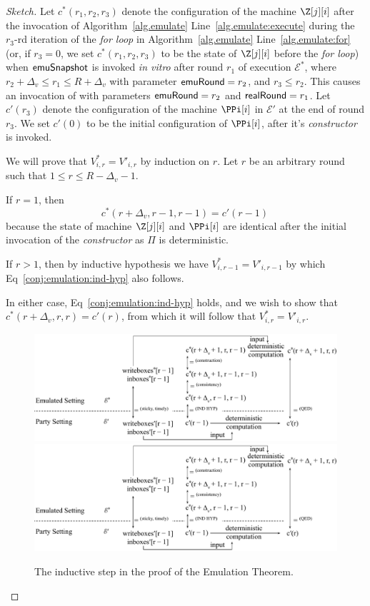 \begin{proof}[Sketch]
  Let $c^*(r_1, r_2, r_3)$ denote the configuration
  of the machine $\Z[j][i]$ after the invocation of
  Algorithm~\ref{alg.emulate} Line~\ref{alg.emulate:execute}
  during the $r_3$-rd iteration of the \emph{for loop} in
  Algorithm~\ref{alg.emulate} Line~\ref{alg.emulate:for}
  (or, if $r_3 = 0$, we set $c^*(r_1, r_2, r_3)$ to be the state of
  $\Z[j][i]$ before the \emph{for loop})
  when $\textsf{emuSnapshot}$ is
  invoked \emph{in vitro} after round $r_1$ of execution $\mathcal{E}^*$,
  where $r_2 + \Delta_v \leq r_1 \leq R + \Delta_v$ with parameter
  $\textsf{emuRound} = r_2$, and $r_3 \leq r_2$.
  This causes an invocation of \emulate with parameters
  $\textsf{emuRound} = r_2$ and $\textsf{realRound} = r_1$.
  Let $c'(r_3)$ denote the configuration of the machine $\PPi[i]$
  in $\mathcal{E}'$ at the end of round $r_3$.
  We set $c'(0)$ to be the initial configuration of $\PPi[i]$,
  after it's \emph{constructor} is invoked.

  We will prove that $V^*_{i,r} = V'_{i,r}$ by induction on $r$.
  Let $r$ be an arbitrary round such that $1 \leq r \leq R - \Delta_v - 1$.

  If $r = 1$, then
  \begin{equation}\label{conj:emulation:ind-hyp}
    c^*(r + \Delta_v, r - 1, r - 1) = c'(r - 1)\,
  \end{equation}
  because the state of machine $\Z[j][i]$ and $\PPi[i]$ are identical
  after the initial invocation of the \emph{constructor} as $\Pi$
  is deterministic.

  If $r > 1$, then by inductive hypothesis we have $V^*_{i,r - 1} = V'_{i,r - 1}$
  by which Eq~\ref{conj:emulation:ind-hyp} also follows.

  In either case, Eq~\ref{conj:emulation:ind-hyp} holds, and we
  wish to show that $c^*(r + \Delta_v, r, r) = c'(r)$,
  from which it will follow that $V^*_{i,r} = V'_{i,r}$.

  \begin{figure}
    \centering
    \iftwocolumn
    \includegraphics[width=0.6 \textwidth,keepaspectratio]{figures/emulation-claim-1-induction.pdf}
    \else
    \includegraphics[width=\textwidth,keepaspectratio]{figures/emulation-claim-1-induction.pdf}
    \fi
    \caption{The inductive step in the proof of the Emulation Theorem.}
    \label{fig.emulation-claim-1-induction}
  \end{figure}


\end{proof}
